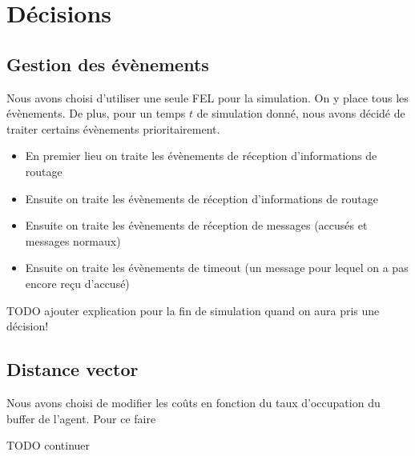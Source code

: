 \documentclass[a4paper,11pt]{article}
\begin{document}
\section{Décisions}

\subsection{Gestion des évènements}
Nous avons choisi d'utiliser une seule FEL pour la simulation. On y place tous les évènements. De plus, pour un temps $t$ de simulation donné, nous avons décidé de traiter certains évènements prioritairement.

\begin{itemize}
 \item En premier lieu on traite les évènements de réception d'informations de routage
 \item Ensuite on traite les évènements de réception d'informations de routage
 \item Ensuite on traite les évènements de réception de messages (accusés et messages normaux)
 \item Ensuite on traite les évènements de timeout (un message pour lequel on a pas encore reçu d'accusé)
\end{itemize}

TODO ajouter explication pour la fin de simulation quand on aura pris une décision!


\subsection{Distance vector}
Nous avons choisi de modifier les coûts en fonction du taux d'occupation du buffer de l'agent. Pour ce faire

TODO continuer


\clearpage


\appendix
\end{document}
